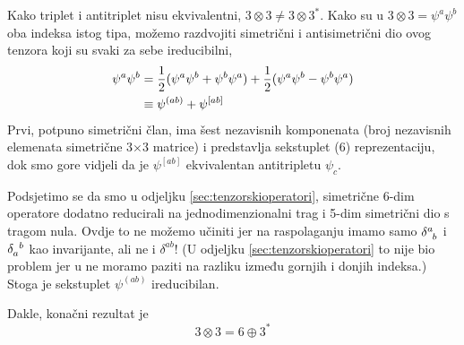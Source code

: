 \begin{primjer}[$3\otimes 3$]
Kako triplet i antitriplet nisu ekvivalentni, $3\otimes 3
\neq 3\otimes 3^*$. Kako su u
$3\otimes 3 = \psi^a \psi^b$ oba indeksa istog tipa,
možemo razdvojiti simetrični i antisimetrični dio ovog
tenzora koji su svaki za sebe ireducibilni,
\begin{align}
\psi^a \psi^b &= \frac{1}{2} (\psi^a\psi^b + \psi^b \psi^a)
               + \frac{1}{2} (\psi^a\psi^b - \psi^b \psi^a) \\
              &\equiv \psi^{(ab)} + \psi^{[ab]}
\end{align}
Prvi, potpuno simetrični član, ima šest nezavisnih komponenata
(broj nezavisnih elemenata simetrične 3$\times$3 matrice) i
predstavlja sekstuplet (6) reprezentaciju, dok smo gore
vidjeli da je $\psi^{[ab]}$ ekvivalentan antitripletu
$\psi_c$. 

Podsjetimo se da smo u odjeljku \ref{sec:tenzorskioperatori},
simetrične 6-dim operatore dodatno reducirali na jednodimenzionalni
trag i 5-dim simetrični dio s tragom nula.  Ovdje to ne možemo učiniti
jer na raspolaganju imamo samo 
$\tensor{\delta}{^a_b}$ i $\tensor{\delta}{_a^b}$ kao  invarijante, 
ali ne i $\delta^{ab}$! (U odjeljku \ref{sec:tenzorskioperatori}
to nije bio problem jer u
 ne moramo paziti na razliku između gornjih i donjih indeksa.)
Stoga je sekstuplet $\psi^{(ab)}$ ireducibilan.

Dakle, konačni rezultat je
\begin{equation}
 3 \otimes 3 = 6 \oplus 3^*
\label{eq:33eq63}
\end{equation}
\end{primjer}

